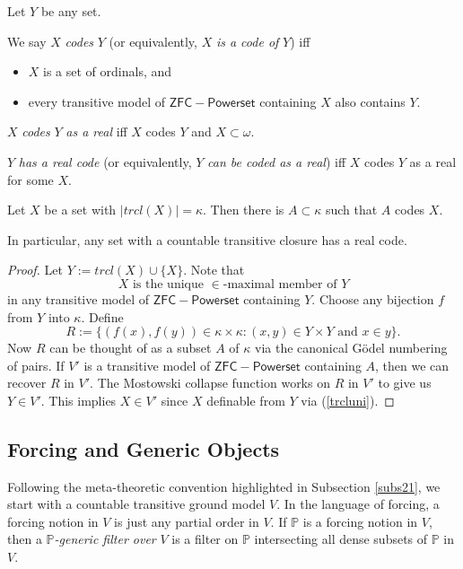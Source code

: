 \documentclass[12pt]{article}
\numberwithin{equation}{section}
\begin{document}
\begin{defi}
Let $Y$ be any set.

We say $X$ \emph{codes} $Y$ (or equivalently, $X$ \emph{is a code of} $Y$) iff 
\begin{itemize}
    \item $X$ is a set of ordinals, and
    \item every transitive model of $\mathsf{ZFC - Powerset}$ containing $X$ also contains $Y$.
\end{itemize}

$X$ \emph{codes} $Y$ \emph{as a real} iff $X$ codes $Y$ and $X \subset \omega$.

$Y$ \emph{has a real code} (or equivalently, $Y$ \emph{can be coded as a real}) iff $X$ codes $Y$ as a real for some $X$.
\end{defi}

\begin{lem}\label{setcode}
Let $X$ be a set with $|trcl(X)| = \kappa$. Then there is $A \subset \kappa$ such that $A$ codes $X$.

In particular, any set with a countable transitive closure has a real code.
\end{lem}

\begin{proof}
Let $Y := trcl(X) \cup \{X\}$. Note that 
\begin{equation}\label{trcluni}
    X \text{ is the unique } \! \in \!\text{-maximal member of } Y
\end{equation} 
in any transitive model of $\mathsf{ZFC - Powerset}$ containing $Y$. Choose any bijection $f$ from $Y$ into $\kappa$. Define $$R := \{(f(x), f(y)) \in \kappa \times \kappa : (x, y) \in Y \times Y \text{ and } x \in y\}.$$ Now $R$ can be thought of as a subset $A$ of $\kappa$ via the canonical G\"{o}del numbering of pairs. If $V'$ is a transitive model of $\mathsf{ZFC - Powerset}$ containing $A$, then we can recover $R$ in $V'$. The Mostowski collapse function works on $R$ in $V'$ to give us $Y \in V'$. This implies $X \in V'$ since $X$ definable from $Y$ via (\ref{trcluni}).
\end{proof}

\subsection{Forcing and Generic Objects}\label{subs24}

Following the meta-theoretic convention highlighted in Subsection \ref{subs21}, we start with a countable transitive ground model $V$. In the language of forcing, a forcing notion in $V$ is just any partial order in $V$. If $\mathbb{P}$ is a forcing notion in $V$, then a $\mathbb{P}$\emph{-generic filter over} $V$ is a filter on $\mathbb{P}$ intersecting all dense subsets of $\mathbb{P}$ in $V$. 
\end{document}
